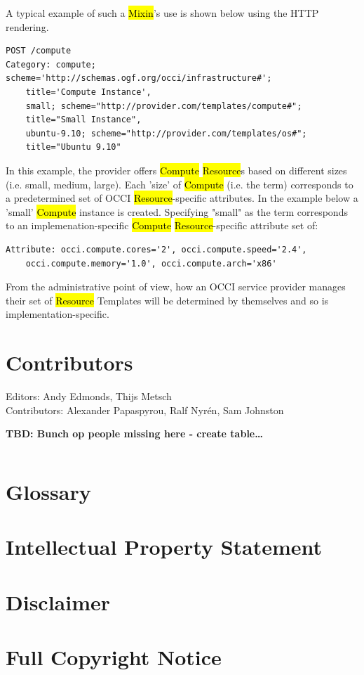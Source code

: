 \documentclass[10pt,a4paper]{article}
\begin{document}
A typical example of such a \hl{Mixin}'s use is shown below using the HTTP rendering. 

\begin{verbatim}
POST /compute
Category: compute; scheme='http://schemas.ogf.org/occi/infrastructure#'; 
    title='Compute Instance', 
    small; scheme="http://provider.com/templates/compute#"; 
    title="Small Instance", 
    ubuntu-9.10; scheme="http://provider.com/templates/os#"; 
    title="Ubuntu 9.10"
\end{verbatim}

In this example, the provider offers \hl{Compute} \hl{Resource}s based on different sizes (i.e. small,
medium, large). Each 'size' of \hl{Compute} (i.e. the term) corresponds to a predetermined set of OCCI 
\hl{Resource}-specific attributes. In the example below a 'small' \hl{Compute} instance is created. 
Specifying "small" as the term corresponds to an implemenation-specific \hl{Compute} \hl{Resource}-specific attribute set of:

\begin{verbatim}
Attribute: occi.compute.cores='2', occi.compute.speed='2.4', 
    occi.compute.memory='1.0', occi.compute.arch='x86'
\end{verbatim}

From the administrative point of view, how an OCCI service provider manages their set of 
\hl{Resource} Templates will be determined by themselves and so is implementation-specific.


\section{Contributors}

Editors: Andy Edmonds, Thijs Metsch \\
Contributors: Alexander Papaspyrou, Ralf Nyr\'en, Sam Johnston

\textbf{TBD: Bunch op people missing here - create table\ldots}

\begin{verbatim}

\end{verbatim}

\section{Glossary}


\section{Intellectual Property Statement}


\section{Disclaimer}


\section{Full Copyright Notice}




\end{document}
